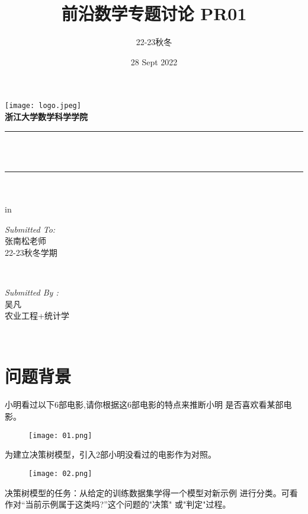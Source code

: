 \documentclass[12pt]{article}
\title{ 前沿数学专题讨论 PR01}								%
\author{22-23秋冬}								%
\date{28 Sept 2022}	%
\makeatletter
\let\thetitle\@title
\let\thedate\@date
\makeatother
\begin{document}

\begin{titlepage}
	\centering
    \vspace*{0.5 cm}
    \texttt{[image: logo.jpeg]}\\[1.0 cm]	%
	\textsc{\Large \textbf{浙江大学数学科学学院} }\\[0.5 cm]				%
	\rule{\linewidth}{0.2 mm} \\[0.4 cm]
	{ \huge \bfseries \thetitle}\\
	\rule{\linewidth}{0.2 mm} \\[1.5 cm]
	{  \bfseries \thedate}\\
	 in
	\begin{minipage}{0.4\textwidth}
		\begin{flushleft} \large
			\emph{Submitted To:}\\
			张南松老师\\
                22-23秋冬学期\\
			\end{flushleft}
			\end{minipage}~
			\begin{minipage}{0.4\textwidth}
            
			\begin{flushright} \large
			\emph{Submitted By :} \\
			吴凡\\
            农业工程+统计学\\
		\end{flushright}
        
	\end{minipage}\\[2 cm]		    
	
\end{titlepage}

\tableofcontents
\pagebreak


\section{问题背景}
小明看过以下6部电影,请你根据这6部电影的特点来推断小明
是否喜欢看某部电影。\\
	\begin{figure}[H]
		\centering
		\texttt{[image: 01.png]}
	\end{figure}
为建立决策树模型，引入2部小明没看过的电影作为对照。\\
	\begin{figure}[H]
		\centering
		\texttt{[image: 02.png]}
	\end{figure}
决策树模型的任务：从给定的训练数据集学得一个模型对新示例
进行分类。可看作对“当前示例属于这类吗?”这个问题的"决策"
或"判定"过程。\\
\end{document}
